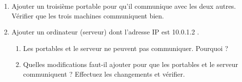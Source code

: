 \documentclass[12pt,a4paper]{article}
\begin{document}
\begin{enumerate}
\item Ajouter un troisième portable pour qu'il communique avec les deux autres. Vérifier que les trois machines communiquent bien.
\item Ajouter un ordinateur (serveur) dont l'adresse IP est 10.0.1.2 .
\begin{enumerate}
\item Les portables et le serveur ne peuvent pas communiquer. Pourquoi ? \vspace{2cm}
\item Quelles modifications faut-il ajouter pour que les portables et le serveur communiquent ? Effectuez les changements et vérifier.
\end{enumerate}
\end{enumerate}
\end{document}
